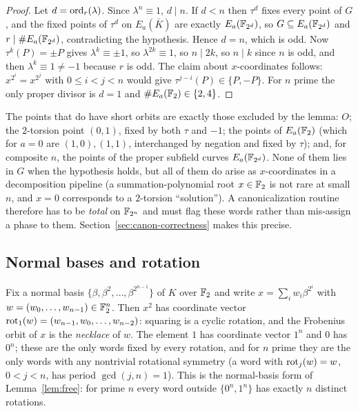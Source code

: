 \begin{proof}
Let $d=\operatorname{ord}_r(\lambda)$. Since $\lambda^n\equiv 1$, $d\mid n$. If
$d<n$ then $\tau^d$ fixes every point of $G$, and the fixed points of
$\tau^d$ on $E_a(\bar K)$ are exactly $E_a(\mathbb{F}_{2^d})$, so
$G\subseteq E_a(\mathbb{F}_{2^d})$ and $r\mid\#E_a(\mathbb{F}_{2^d})$, contradicting
the hypothesis. Hence $d=n$, which is odd. Now
$\tau^k(P)=\pm P$ gives $\lambda^k\equiv\pm1$, so
$\lambda^{2k}\equiv 1$, so $n\mid 2k$, so $n\mid k$ since $n$ is odd,
and then $\lambda^k\equiv 1\ne -1$ because $r$ is odd. The claim about
$x$-coordinates follows: $x^{2^i}=x^{2^j}$ with $0\le i<j<n$ would give
$\tau^{j-i}(P)\in\{P,-P\}$. For $n$ prime the only proper divisor is
$d=1$ and $\#E_a(\mathbb{F}_2)\in\{2,4\}$.
\end{proof}

\begin{remark}
\label{rem:short}
The points that do have short orbits are exactly those excluded by the
lemma: $O$; the $2$-torsion point $(0,1)$, fixed by both $\tau$ and
$-1$; the points of $E_a(\mathbb{F}_2)$ (which for $a=0$ are
$(1,0),(1,1)$, interchanged by negation and fixed by $\tau$); and, for
composite $n$, the points of the proper subfield curves
$E_a(\mathbb{F}_{2^d})$. None of them lies in $G$ when the hypothesis holds,
but all of them do arise as $x$-coordinates in a decomposition
pipeline (a summation-polynomial root $x\in\mathbb{F}_2$ is not rare at small
$n$, and $x=0$ corresponds to a $2$-torsion ``solution''). A
canonicalization routine therefore has to be \emph{total} on
$\mathbb{F}_{2^n}$ and must flag these words rather than mis-assign a phase to
them. Section~\ref{sec:canon-correctness} makes this precise.
\end{remark}

\subsection{Normal bases and rotation}

Fix a normal basis $\{\beta,\beta^2,\dots,\beta^{2^{n-1}}\}$ of $K$
over $\mathbb{F}_2$ and write $x=\sum_i w_i\beta^{2^i}$ with
$w=(w_0,\dots,w_{n-1})\in\mathbb{F}_2^n$. Then $x^2$ has coordinate vector
$\operatorname{rot}_1(w)=(w_{n-1},w_0,\dots,w_{n-2})$: squaring is a cyclic
rotation, and the Frobenius orbit of $x$ is the \emph{necklace} of
$w$. The element $1$ has coordinate vector $1^n$ and $0$ has $0^n$;
these are the only words fixed by every rotation, and for $n$ prime
they are the only words with any nontrivial rotational symmetry
(a word with $\operatorname{rot}_j(w)=w$, $0<j<n$, has period $\gcd(j,n)=1$). This is
the normal-basis form of Lemma~\ref{lem:free}: for prime $n$ every
word outside $\{0^n,1^n\}$ has exactly $n$ distinct rotations.

